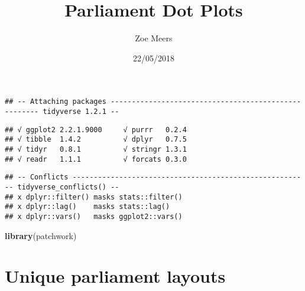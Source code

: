 \documentclass[]{article}
\title{Parliament Dot Plots}
\author{Zoe Meers}
\date{22/05/2018}
\newenvironment{Shaded}{\begin{snugshade}}{\end{snugshade}}
\newcommand{\DataTypeTok}[1]{\textcolor[rgb]{0.13,0.29,0.53}{#1}}
\newcommand{\KeywordTok}[1]{\textcolor[rgb]{0.13,0.29,0.53}{\textbf{#1}}}
\newcommand{\NormalTok}[1]{#1}
\newcommand{\OperatorTok}[1]{\textcolor[rgb]{0.81,0.36,0.00}{\textbf{#1}}}
\newcommand{\OtherTok}[1]{\textcolor[rgb]{0.56,0.35,0.01}{#1}}
\newcommand{\StringTok}[1]{\textcolor[rgb]{0.31,0.60,0.02}{#1}}
\begin{document}
\maketitle

{
\setcounter{tocdepth}{4}
\tableofcontents
}
\begin{Shaded}
\end{Shaded}

\begin{verbatim}
## -- Attaching packages ----------------------------------------------------- tidyverse 1.2.1 --
\end{verbatim}

\begin{verbatim}
## √ ggplot2 2.2.1.9000     √ purrr   0.2.4     
## √ tibble  1.4.2          √ dplyr   0.7.5     
## √ tidyr   0.8.1          √ stringr 1.3.1     
## √ readr   1.1.1          √ forcats 0.3.0
\end{verbatim}

\begin{verbatim}
## -- Conflicts -------------------------------------------------------- tidyverse_conflicts() --
## x dplyr::filter() masks stats::filter()
## x dplyr::lag()    masks stats::lag()
## x dplyr::vars()   masks ggplot2::vars()
\end{verbatim}

\begin{Shaded}
\begin{Highlighting}[]
\KeywordTok{library}\NormalTok{(patchwork)}
\end{Highlighting}
\end{Shaded}

\hypertarget{unique-parliament-layouts}{%
\section{Unique parliament layouts}\label{unique-parliament-layouts}}
\end{document}
